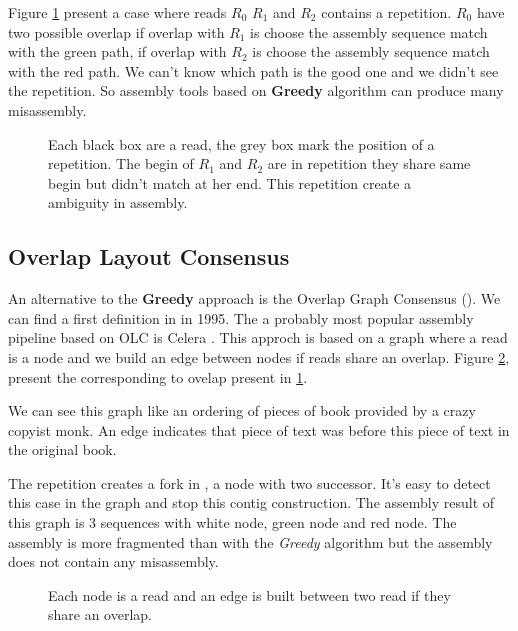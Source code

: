 \documentclass[main]{subfiles}
\begin{document}
Figure \ref{intro:fig:greedy:repetition} present a case where reads $R_0$ $R_1$ and $R_2$ contains a repetition. $R_0$ have two possible overlap if overlap with $R_1$ is choose the assembly sequence match with the green path, if overlap with $R_2$ is choose the assembly sequence match with the red path. We can't know which path is the good one and we didn't see the repetition. So assembly tools based on \textbf{Greedy} algorithm can produce many misassembly. 

\begin{figure}[ht]
    \centering 
    
    \caption{Each black box are a read, the grey box mark the position of a repetition. The begin of $R_1$ and $R_2$ are in repetition they share same begin but didn't match at her end. This repetition create a ambiguity in assembly.}
    \label{intro:fig:greedy:repetition}
\end{figure}

\subsection{Overlap Layout Consensus} \label{intro:subsec:OLC}

An alternative to the \textbf{Greedy} approach is the Overlap Graph Consensus (\OLC). We can find a first \OLC definition in \cite{OLC_myers} in 1995. The a probably most popular assembly pipeline based on OLC is Celera \cite{celera_first, celera_second}. This approch is based on a graph where a read is a node and we build an edge between nodes if reads share an overlap. Figure \ref{intro:fig:olc:graph}, present the \OLC corresponding to ovelap present in \ref{intro:fig:greedy:repetition}.

We can see this graph like an ordering of pieces of book provided by a crazy copyist monk. An edge indicates that piece of text was before this piece of text in the original book.

The repetition creates a fork in \OLC, a node with two successor. It's easy to detect this case in the graph and stop this contig construction. The assembly result of this graph is 3 sequences with white node, green node and red node. The assembly is more fragmented than with the \textit{Greedy} algorithm but the assembly does not contain any misassembly.

\begin{figure}[ht]
    \centering 
    
    \caption{Each node is a read and an edge is built between two read if they share an overlap.}
    \label{intro:fig:olc:graph}
\end{figure}
\end{document}
